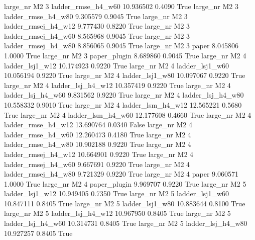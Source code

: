   large_nr       M2                 3  ladder_rmse_h4_w60   10.936502      0.4090    True
  large_nr       M2                 3  ladder_rmse_h4_w80    9.305579      0.9045    True
  large_nr       M2                 3 ladder_rmsej_h4_w12    9.777430      0.8220    True
  large_nr       M2                 3 ladder_rmsej_h4_w60    8.565968      0.9045    True
  large_nr       M2                 3 ladder_rmsej_h4_w80    8.856065      0.9045    True
  large_nr       M2                 3               paper    8.045806      1.0000    True
  large_nr       M2                 3        paper_plugin    8.689860      0.9045    True
  large_nr       M2                 4     ladder_lsj1_w12   10.174923      0.9220    True
  large_nr       M2                 4     ladder_lsj1_w60   10.056194      0.9220    True
  large_nr       M2                 4     ladder_lsj1_w80   10.097067      0.9220    True
  large_nr       M2                 4   ladder_lsj_h4_w12   10.357419      0.9220    True
  large_nr       M2                 4   ladder_lsj_h4_w60    9.831562      0.9220    True
  large_nr       M2                 4   ladder_lsj_h4_w80   10.558332      0.9010    True
  large_nr       M2                 4   ladder_lsm_h4_w12   12.565221      0.5680    True
  large_nr       M2                 4   ladder_lsm_h4_w60   12.177608      0.4660    True
  large_nr       M2                 4  ladder_rmse_h4_w12   13.690764      0.0340   False
  large_nr       M2                 4  ladder_rmse_h4_w60   12.260473      0.4180    True
  large_nr       M2                 4  ladder_rmse_h4_w80   10.902188      0.9220    True
  large_nr       M2                 4 ladder_rmsej_h4_w12   10.664901      0.9220    True
  large_nr       M2                 4 ladder_rmsej_h4_w60    9.667691      0.9220    True
  large_nr       M2                 4 ladder_rmsej_h4_w80    9.721329      0.9220    True
  large_nr       M2                 4               paper    9.060571      1.0000    True
  large_nr       M2                 4        paper_plugin    9.969707      0.9220    True
  large_nr       M2                 5     ladder_lsj1_w12   10.949405      0.7350    True
  large_nr       M2                 5     ladder_lsj1_w60   10.847111      0.8405    True
  large_nr       M2                 5     ladder_lsj1_w80   10.883644      0.8100    True
  large_nr       M2                 5   ladder_lsj_h4_w12   10.967950      0.8405    True
  large_nr       M2                 5   ladder_lsj_h4_w60   10.314731      0.8405    True
  large_nr       M2                 5   ladder_lsj_h4_w80   10.927257      0.8405    True
